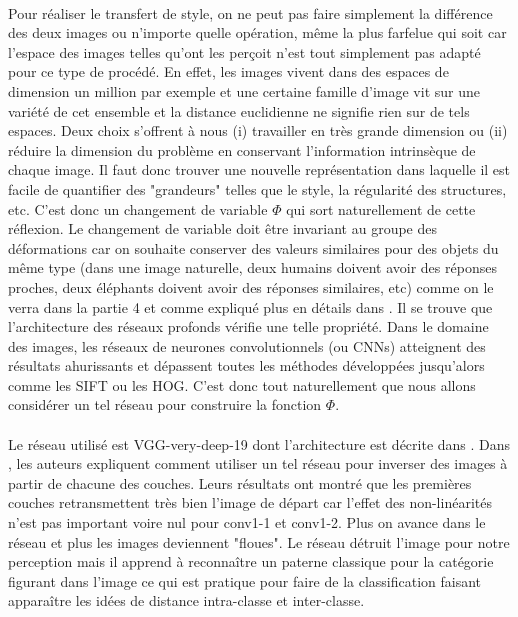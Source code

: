 \documentclass{article}
\begin{document}
\paragraph*{}
Pour réaliser le transfert de style, on ne peut pas faire simplement la différence des deux images ou n'importe quelle opération, même la plus farfelue qui soit car l'espace des images telles qu'ont les perçoit n'est tout simplement pas adapté pour ce type de procédé. En effet, les images vivent dans des espaces de dimension un million par exemple et une certaine famille d'image vit sur une variété de cet ensemble et la distance euclidienne ne signifie rien sur de tels espaces. Deux choix s'offrent à nous (i) travailler en très grande dimension ou (ii) réduire la dimension du problème en conservant l'information intrinsèque de chaque image. Il faut donc trouver une nouvelle représentation dans laquelle il est facile de quantifier des "grandeurs" telles que le style, la régularité des structures, etc. C'est donc un changement de variable $\Phi$ qui sort naturellement de cette réflexion.
Le changement de variable doit être invariant au groupe des déformations car on souhaite conserver des valeurs similaires pour des objets du même type (dans une image naturelle, deux humains doivent avoir des réponses proches, deux éléphants doivent avoir des réponses similaires, etc) comme on le verra dans la partie 4 et comme expliqué plus en détails dans \cite{2016RSPTA.37450203M}. Il se trouve que l'architecture des réseaux profonds vérifie une telle propriété. Dans le domaine des images, les réseaux de neurones convolutionnels (ou CNNs) atteignent des résultats ahurissants et dépassent toutes les méthodes développées jusqu'alors comme les SIFT ou les HOG. C'est donc tout naturellement que nous allons considérer un tel réseau pour construire la fonction $\Phi$.
\paragraph*{}
Le réseau utilisé est VGG-very-deep-19 dont l'architecture est décrite dans \cite{DBLP:journals/corr/SimonyanZ14a}. Dans \cite{DBLP:journals/corr/MahendranV14}, les auteurs expliquent comment utiliser un tel réseau pour inverser des images à partir de chacune des couches. Leurs résultats ont montré que les premières couches retransmettent très bien l'image de départ car l'effet des non-linéarités n'est pas important voire nul pour conv1-1 et conv1-2. Plus on avance dans le réseau et plus les images deviennent "floues". Le réseau détruit l'image pour notre perception mais il apprend à reconnaître un paterne classique pour la catégorie figurant dans l'image ce qui est pratique pour faire de la classification faisant apparaître les idées de distance intra-classe et inter-classe.
 
\end{document}
